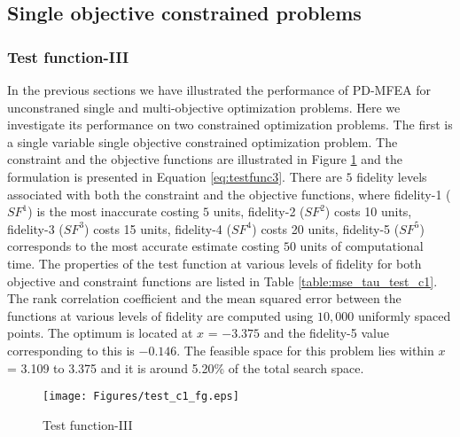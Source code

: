 \subsection{Single objective constrained problems}

\subsubsection{Test function-III}
In the previous sections we have illustrated the performance of PD-MFEA for unconstraned single and multi-objective optimization problems. Here we investigate its performance on two constrained optimization problems. The first is a single variable single objective constrained optimization problem. The constraint and the objective functions are illustrated in Figure \ref{fig:test_c1} and the formulation is presented in Equation \ref{eq:testfunc3}. There are $5$ fidelity levels associated with both the constraint and the objective functions, where fidelity-1 ($SF^1$) is the most inaccurate costing $5$ units, fidelity-2 ($SF^2$) costs 10 units, fidelity-3 ($SF^3$) costs 15 units, fidelity-4 ($SF^4$) costs 20 units, fidelity-5 ($SF^5$) corresponds to the most accurate estimate costing $50$ units of computational time. The properties of the test function at various levels of fidelity for both objective and constraint functions are listed in Table \ref{table:mse_tau_test_c1}. The rank correlation coefficient and the mean squared error between the functions at various levels of fidelity are computed using $10,000$ uniformly spaced points. The optimum is located at $x$ = $-3.375$ and the fidelity-5 value corresponding to this is $-0.146$. The feasible space for this problem lies within $x$ = 3.109 to 3.375 and it is around 5.20\% of the total search space.

\begin{figure}[!ht]
	\centering
	\texttt{[image: Figures/test\_c1\_fg.eps]}
	\caption{Test function-III}
	\label{fig:test_c1}       
\end{figure}

